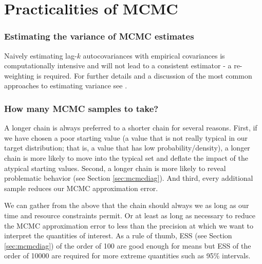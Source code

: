 \documentclass{book}
\theoremstyle{plain}%
\theoremstyle{definition}
\begin{document}


\section{Practicalities of MCMC}

\subsubsection*{Estimating the variance of MCMC estimates}\label{sec:mcmcvar}

Naively estimating lag-$k$ autocovariances with empirical covariances is computationally intensive and will not lead to a consistent estimator - a re-weighting is required. For further details and a discussion of the most common approaches to estimating variance see \citep[Section~3]{Geyer1992}.

\subsubsection*{How many MCMC samples to take?}\label{sec:mcmchowmany}

A longer chain is always preferred to a shorter chain for several reasons. First, if we have chosen a poor starting value (a value that is not really typical in our target distribution; that is, a value that has low probability/density), a longer chain is more likely to move into the typical set and deflate the impact of the atypical starting values. Second, a longer chain is more likely to reveal problematic behavior (see Section \ref{sec:mcmcdiag}). And third, every additional sample reduces our MCMC approximation error.

We can gather from the above that the chain should always we as long as our time and resource constraints permit. Or at least as long as necessary to reduce the MCMC approximation error to less than the precision at which we want to interpret the quantities of interest. As a rule of thumb, ESS (see Section \ref{sec:mcmcdiag}) of the order of 100 are good enough for means but ESS of the order of 10000 are required for more extreme quantities such as 95\% intervals.
\end{document}
